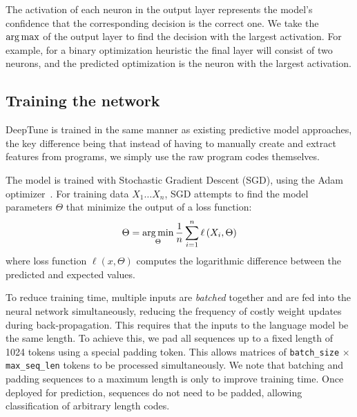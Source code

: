 The activation of each neuron in the output layer represents the model's
confidence that the corresponding decision is the correct one. We take the
$\operatorname*{arg\,max}$ of the output layer to find the decision with the largest activation.
For example, for a binary optimization heuristic the final layer will consist of
two neurons, and the predicted optimization is the neuron with the largest
activation.


\subsection{Training the network}

DeepTune is trained in the same manner as existing predictive model approaches,
the key difference being that instead of having to manually create and extract
features from programs, we simply use the raw program codes themselves.

The model is trained with Stochastic Gradient Descent (SGD), using the Adam
optimizer~\cite{Kingma2015}. For training data $X_1 \ldots X_n$, SGD attempts to
find the model parameters $\Theta$ that minimize the output of a loss function:
%
\[ \Theta = \operatorname*{arg\,min}_{\Theta} \frac{1}{n} \sum_{i=1}^{n} \ell \left(X_i, \Theta \right) \]
%
where loss function $\ell \left(x, \Theta \right)$ computes the logarithmic
difference between the predicted and expected values.

To reduce training time, multiple inputs are \emph{batched} together and are fed
into the neural network simultaneously, reducing the frequency of costly weight
updates during back-propagation. This requires that the inputs to the language
model be the same length. To achieve this, we pad all sequences up to a fixed
length of 1024 tokens using a special padding token. This allows matrices of
\texttt{batch\_size} $\times$ \texttt{max\_seq\_len} tokens to be processed
simultaneously. We note that batching and padding sequences to a maximum length
is only to improve training time. Once deployed for prediction, sequences do not
need to be padded, allowing classification of arbitrary length codes.
